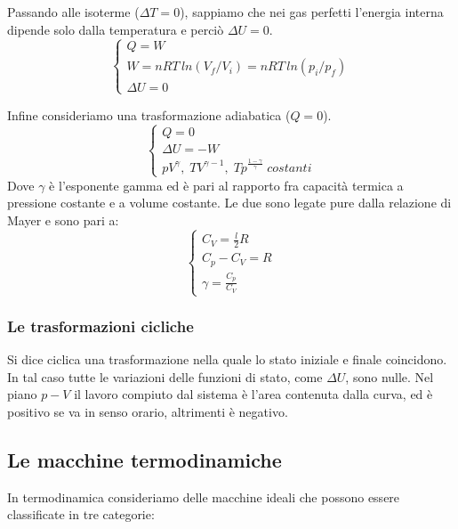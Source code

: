 \documentclass{article}
\begin{document}
Passando alle isoterme ($\Delta T=0$), sappiamo che nei gas perfetti l'energia interna dipende solo dalla temperatura e perciò $\Delta U=0$.
\begin{equation}
    \begin{cases}
        Q=W\\
        W=nRT\,ln(V_f/V_i)=nRT\,ln(p_i/p_f)\\
        \Delta U=0
    \end{cases}
\end{equation}
\vspace{3mm}

Infine consideriamo una trasformazione adiabatica ($Q=0$).
\begin{equation}
    \begin{cases}
        Q=0 \\
        \Delta U=-W \\
        pV^\gamma,\; TV^{\gamma-1},\; Tp^{\frac{1-\gamma}{\gamma}}\; costanti
    \end{cases}
\end{equation}
Dove $\gamma$ è l'esponente gamma ed è pari al rapporto fra capacità termica a pressione costante e a volume costante. Le due sono legate pure dalla relazione di Mayer e sono pari a: 
\begin{equation}
    \begin{cases}
        C_V=\frac{l}{2}R \\
        C_p-C_V=R \\
        \gamma=\frac{C_p}{C_V}
    \end{cases}
\end{equation}




\subsubsection{Le trasformazioni cicliche}
Si dice ciclica una trasformazione nella quale lo stato iniziale e finale coincidono. In tal caso tutte le variazioni delle funzioni di stato, come $\Delta U$, sono nulle. Nel piano $p-V$ il lavoro compiuto dal sistema è l'area contenuta dalla curva, ed è positivo se va in senso orario, altrimenti è negativo.

\subsection{Le macchine termodinamiche}
In termodinamica consideriamo delle macchine ideali che possono essere classificate in tre categorie:
\end{document}
